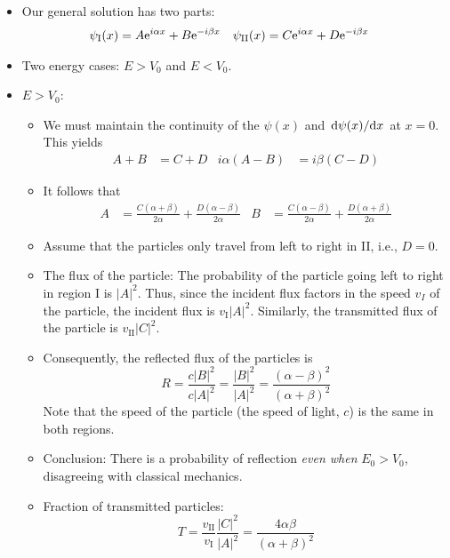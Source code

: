\documentclass[../notes.tex]{subfiles}
\begin{document}
\begin{itemize}
\begin{itemize}
        \item Our general solution has two parts:
        \begin{align*}
            \psi_\text{I}(x)  &= A\e[i\alpha x]+B\e[-i\beta x]&
            \psi_\text{II}(x) &= C\e[i\alpha x]+D\e[-i\beta x]
        \end{align*}
        \item Two energy cases: $E>V_0$ and $E<V_0$.
        \item $E>V_0$:
        \begin{itemize}
            \item We must maintain the continuity of the $\psi(x)$ and $\dv*{\psi(x)}{x}$ at $x=0$. This yields
            \begin{align*}
                A+B &= C+D&
                i\alpha(A-B) &= i\beta(C-D)
            \end{align*}
            \item It follows that
            \begin{align*}
                A &= \frac{C(\alpha+\beta)}{2\alpha}+\frac{D(\alpha-\beta)}{2\alpha}&
                B &= \frac{C(\alpha-\beta)}{2\alpha}+\frac{D(\alpha+\beta)}{2\alpha}
            \end{align*}
            \item Assume that the particles only travel from left to right in II, i.e., $D=0$.
            \item The flux of the particle: The probability of the particle going left to right in region I is $|A|^2$. Thus, since the incident flux factors in the speed $v_I$ of the particle, the incident flux is $v_\text{I}|A|^2$. Similarly, the transmitted flux of the particle is $v_\text{II}|C|^2$.
            \item Consequently, the reflected flux of the particles is
            \begin{equation*}
                R = \frac{c|B|^2}{c|A|^2} = \frac{|B|^2}{|A|^2} = \frac{(\alpha-\beta)^2}{(\alpha+\beta)^2}
            \end{equation*}
            Note that the speed of the particle (the speed of light, $c$) is the same in both regions.
            \item Conclusion: There is a probability of reflection \emph{even when} $E_0>V_0$, disagreeing with classical mechanics.
            \item Fraction of transmitted particles:
            \begin{equation*}
                T = \frac{v_\text{II}}{v_\text{I}}\frac{|C|^2}{|A|^2} = \frac{4\alpha\beta}{(\alpha+\beta)^2}

\end{equation*}
\end{itemize}
\end{itemize}
\end{itemize}
\end{document}
